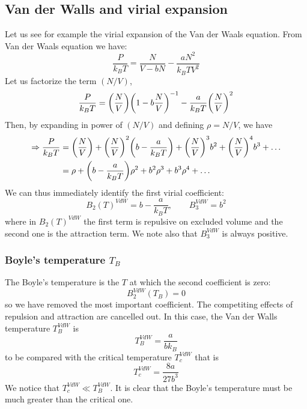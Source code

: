 \documentclass[../main/main.tex]{subfiles}
\begin{document}
\subsection{Van der Walls and virial expansion}
Let us see for example the virial expansion of the Van der Waals equation. From Van der Waals equation we have:
\begin{equation*}
  \frac{P}{k_B T} = \frac{N}{V-bN} - \frac{a N^2}{k_B T V^2}
\end{equation*}
Let us factorize the term \( (N/V) \),
\begin{equation*}
  \frac{P}{k_B T} = \qty(\frac{N}{V}) \qty(1 - b \frac{N}{V})^{-1} - \frac{a}{k_B T}\qty(\frac{N}{V})^2
\end{equation*}
Then, by expanding in power of \( (N/V) \) and defining \( \rho = N/V \), we have
\begin{equation*}
\begin{split}
  \Rightarrow \frac{P}{k_B T}  &= \qty(\frac{N}{V}) + \qty(\frac{N}{V})^2 \qty(b - \frac{a}{k_B T}) + \qty(\frac{N}{V})^3 b^2 + \qty(\frac{N}{V})^4 b^3 + \dots \\
  & = \rho + \qty(b - \frac{a}{k_B T})\rho ^2 + b^2 \rho ^3 + b^3 \rho ^4 + \dots
\end{split}
\end{equation*}
We can thus immediately identify the first virial coefficient:
\begin{equation*}
  B_2 (T)^{VdW} = b - \frac{a}{k_B T}, \qquad B_3^{VdW} = b^2
\end{equation*}
where in \( B_2 (T)^{VdW}  \) the first term is repulsive on excluded volume and the second one is the attraction term. We note also that \( B_3^{VdW} \) is always positive.

\subsubsection{Boyle's temperature \( T_B \) }
The Boyle's temperature is the \( T \) at which the second coefficient is zero:
\begin{equation*}
  B_2^{VdW} (T_B) = 0
\end{equation*}
so we have removed the most important coefficient. The competiting effects of repulsion and attraction are cancelled out. In this case, the Van der Walls temperature \( T_B^{VdW} \) is
\begin{equation*}
  T_B^{VdW} = \frac{a}{b k_B}
\end{equation*}
to be compared with the critical temperature \( T_c^{VdW} \) that is
\begin{equation*}
  T_c^{VdW} = \frac{8 a}{27 b^3}
\end{equation*}
We notice that \( T_c^{VdW} \ll T_B ^{VdW} \).  It is clear that the Boyle's temperature must be much greater than the critical one.
\end{document}
